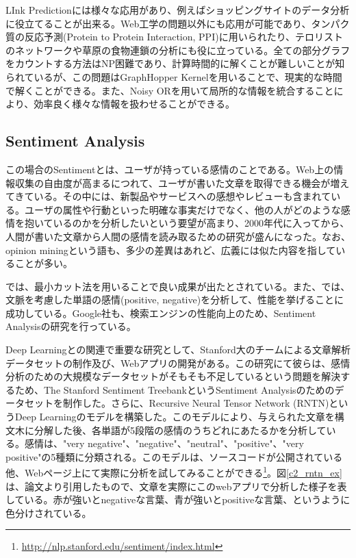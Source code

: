 LInk Predictionには様々な応用があり、例えばショッピングサイトのデータ分析に役立てることが出来る\cite{clauset2004finding}。Web工学の問題以外にも応用が可能であり、タンパク質の反応予測(Protein to Protein Interaction, PPI)に用いられたり\cite{bader2003gaining}、テロリストのネットワークや草原の食物連鎖の分析にも役に立っている\cite{clauset2008hierarchical}。全ての部分グラフをカウントする方法はNP困難であり、計算時間的に解くことが難しいことが知られている\cite{gartner2003graph}が、この問題はGraphHopper Kernelを用いることで、現実的な時間で解くことができる\cite{feragen2013scalable}。また、Noisy ORを用いて局所的な情報を統合することにより、効率良く様々な情報を扱わせることができる\cite{changpinyo2013similarity}。

\subsection{Sentiment Analysis}
この場合のSentimentとは、ユーザが持っている感情のことである。Web上の情報収集の自由度が高まるにつれて、ユーザが書いた文章を取得できる機会が増えてきている。その中には、新製品やサービスへの感想やレビューも含まれている。ユーザの属性や行動といった明確な事実だけでなく、他の人がどのような感情を抱いているのかを分析したいという要望が高まり、2000年代に入ってから、人間が書いた文章から人間の感情を読み取るための研究が盛んになった\cite{pang2008opinion}。なお、opinion miningという語も、多少の差異はあれど、広義には似た内容を指していることが多い。\par
\cite{pang2004sentimental}では、最小カット法を用いることで良い成果が出たとされている。また、\cite{wilson2005recognizing}では、文脈を考慮した単語の感情(positive, negative)を分析して、性能を挙げることに成功している。Google社も、検索エンジンの性能向上のため、Sentiment Analysisの研究を行っている\cite{godbole2007large}。\par
Deep Learningとの関連で重要な研究として、Stanford大のチームによる文章解析データセットの制作及び、Webアプリの開発がある\cite{socher2013recursive}。この研究にて彼らは、感情分析のための大規模なデータセットがそもそも不足しているという問題を解決するため、The Stanford Sentiment TreebankというSentiment Analysisのためのデータセットを制作した。さらに、Recursive Neural Tensor Network (RNTN)というDeep Learningのモデルを構築した。このモデルにより、与えられた文章を構文木に分解した後、各単語が5段階の感情のうちどれにあたるかを分析している。感情は、"very negative"、"negative"、"neutral"、"positive"、"very positive"の5種類に分類される。このモデルは、ソースコードが公開されている他、Webページ上にて実際に分析を試してみることができる\footnote{\url{http://nlp.stanford.edu/sentiment/index.html}}。図\ref{c2_rntn_ex}は、論文より引用したもので、文章を実際にこのwebアプリで分析した様子を表している。赤が強いとnegativeな言葉、青が強いとpositiveな言葉、というように色分けされている。
